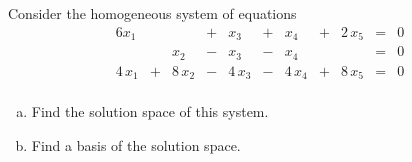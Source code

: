 
\begin{exerciseStatement}


Consider the homogeneous system of equations 
\begin{alignat*}{6} x_{1} & &  &+& x_{3} &+& x_{4} &+& 2 \, x_{5} &=& 0 \\ & & x_{2} &-& x_{3} &-& x_{4} & &  &=& 0 \\4 \, x_{1} &+& 8 \, x_{2} &-& 4 \, x_{3} &-& 4 \, x_{4} &+& 8 \, x_{5} &=& 0 \\ \end{alignat*}
            


\begin{enumerate}[(a)]
\item  Find the solution space of this system.
\item  Find a basis of the solution space.
\end{enumerate}
    
\end{exerciseStatement}
    
